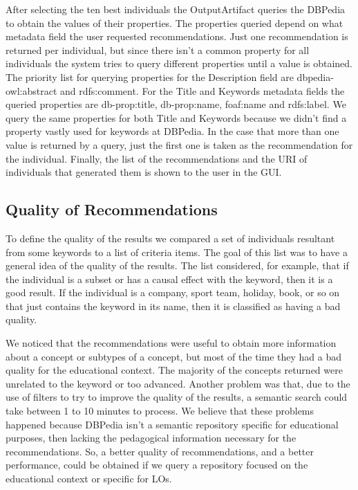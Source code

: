 \documentclass[a4paper,twoside]{article}
\begin{document}
After selecting the ten best individuals the OutputArtifact queries the DBPedia to obtain the values of their properties. The properties queried depend on what metadata field the user requested recommendations. Just one recommendation is returned per individual, but since there isn't a common property for all individuals the system tries to query different properties until a value is obtained. The priority list for querying properties for the Description field are dbpedia-owl:abstract and rdfs:comment. For the Title and Keywords metadata fields the queried properties are db-prop:title, db-prop:name, foaf:name and rdfs:label. We query the same properties for both Title and Keywords because we didn't find a property vastly used for keywords at DBPedia. In the case that more than one value is returned by a query, just the first one is taken as the recommendation for the individual. Finally, the list of the recommendations and the URI of individuals that generated them is shown to the user in the GUI.

\subsection{Quality of Recommendations}

\noindent To define the quality of the results we compared a set of individuals resultant from some keywords to a list of criteria items. The goal of this list was to have a general idea of the quality of the results. The list considered, for example, that if the individual is a subset or has a causal effect with the keyword, then it is a good result. If the individual is a company, sport team, holiday, book, or so on that just contains the keyword in its name, then it is classified as having a bad quality.

We noticed that the recommendations were useful to obtain more information about a concept or subtypes of a concept, but most of the time they had a bad quality for the educational context. The majority of the concepts returned were unrelated to the keyword or too advanced. Another problem was that, due to the use of filters to try to improve the quality of the results, a semantic search could take between 1 to 10 minutes to process. We believe that these problems happened because DBPedia isn't a semantic repository specific for educational purposes, then lacking the pedagogical information necessary for the recommendations. So, a better quality of recommendations, and a better performance, could be obtained if we query a repository focused on the educational context or specific for LOs.
\end{document}
